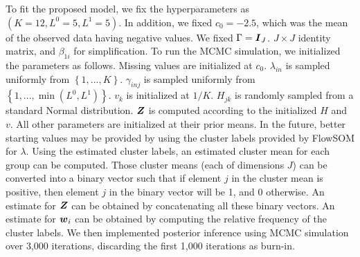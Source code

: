 \documentclass[12pt,]{article}
\newcommand{\bc}[1]{ \left\{#1\right\} }
\newcommand{\bZ}{\mbox{\boldmath $Z$}}
\newcommand{\bw}{\mbox{\boldmath $w$}}
\newcommand{\bI}{\mbox{\boldmath $I$}}
\begin{document}
To fit the proposed model, we fix the hyperparameters as
$(K=12, L^0=5, L^1=5)$. In addition, we fixed $c_0=-2.5$, which was
the mean of the observed data having negative values.
%
We fixed $\Gamma=\bI_J$. $J\times J$ identity matrix, and $\beta_{1i}$ for
simplification. To run the MCMC simulation, we initialized the parameters
as follows.
Missing values are initialized at $c_0$. $\lambda_{in}$ is sampled uniformly
from $\bc{1,...,K}$. $\gamma_{inj}$ is sampled uniformly from
$\bc{1,...,\min(L^0,L^1)}$. $v_k$ is initialized at $1/K$. $H_{jk}$ is randomly
sampled from a standard Normal distribution. $\bZ$ is computed according
to the initialized $H$ and $v$. All other parameters are initialized at
their prior means.
%
In the future, better starting values may be provided by using the cluster
labels provided by FlowSOM for $\lambda$. Using the estimated cluster labels,
an estimated cluster mean for each group can be computed. Those cluster means
(each of dimensions $J$) can be converted into a binary vector such that if
element $j$ in the cluster mean is positive, then element $j$ in the binary
vector will be 1, and 0 otherwise. An estimate for $\bZ$ can be obtained by 
concatenating all these binary vectors. An estimate for $\bw_i$ can be
obtained by computing the relative frequency of the cluster labels.
%
We then implemented posterior inference using MCMC simulation
over 3,000 iterations, discarding the first 1,000 iterations as burn-in.
%
\end{document}
